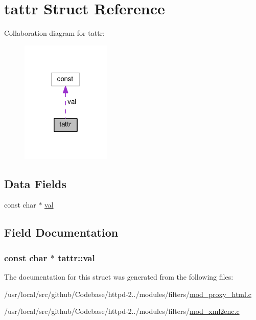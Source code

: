 \hypertarget{structtattr}{}\section{tattr Struct Reference}
\label{structtattr}


Collaboration diagram for tattr\+:
\nopagebreak
\begin{figure}[H]
\begin{center}
\leavevmode
\includegraphics[width=121pt]{structtattr__coll__graph}
\end{center}
\end{figure}
\subsection*{Data Fields}
\begin{DoxyCompactItemize}
\item 
const char $\ast$ \hyperlink{structtattr_ab5a6db0117c0813fb08cd4e7f2135731}{val}
\end{DoxyCompactItemize}


\subsection{Field Documentation}
\subsubsection[{\texorpdfstring{val}{val}}]{\setlength{\rightskip}{0pt plus 5cm}const char $\ast$ tattr\+::val}\hypertarget{structtattr_ab5a6db0117c0813fb08cd4e7f2135731}{}\label{structtattr_ab5a6db0117c0813fb08cd4e7f2135731}


The documentation for this struct was generated from the following files\+:\begin{DoxyCompactItemize}
\item 
/usr/local/src/github/\+Codebase/httpd-\/2../modules/filters/\hyperlink{mod__proxy__html_8c}{mod\+\_\+proxy\+\_\+html.\+c}\item 
/usr/local/src/github/\+Codebase/httpd-\/2../modules/filters/\hyperlink{mod__xml2enc_8c}{mod\+\_\+xml2enc.\+c}\end{DoxyCompactItemize}
